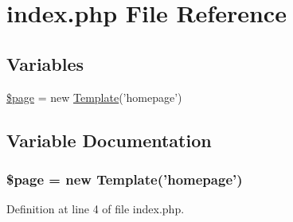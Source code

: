 \hypertarget{index_8php}{\section{index.\-php File Reference}
\label{index_8php}
}
\subsection*{Variables}
\begin{DoxyCompactItemize}
\item 
\hyperlink{index_8php_a0a44e6760141442bb439b1ab1395d8ff}{\$page} = new \hyperlink{class_template}{Template}('homepage')
\end{DoxyCompactItemize}


\subsection{Variable Documentation}
\hypertarget{index_8php_a0a44e6760141442bb439b1ab1395d8ff}{
\subsubsection[{\$page}]{\setlength{\rightskip}{0pt plus 5cm}\$page = new {\bf Template}('homepage')}}\label{index_8php_a0a44e6760141442bb439b1ab1395d8ff}


Definition at line 4 of file index.\-php.

